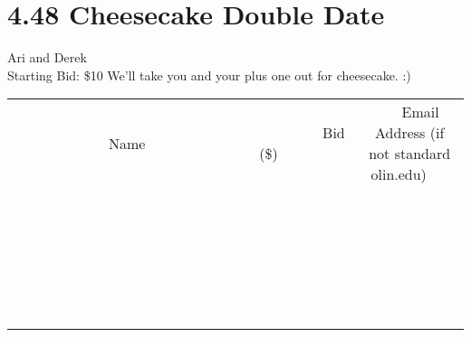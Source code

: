\documentclass[11pt]{article}
\begin{document}
\section*{4.48 Cheesecake Double Date}
Ari and Derek
\\
Starting Bid: \$10
\newline
We'll take you and your plus one out for cheesecake. :)
\\[6ex]
\begin{tabular}{c c c}
~~~~~~~~~~~~~Name~~~~~~~~~~~~~ & ~~~~~~~~~Bid (\$)~~~~~~~~~  & ~~~Email Address (if not standard olin.edu)~~~\\
 & & \\
\hline
 & & \\
\hline
 & & \\
\hline
 & & \\
\hline
 & & \\
\hline
 & & \\
\hline
 & & \\
\hline
 & & \\
\hline
 & & \\
\hline
 & & \\
\hline
 & & \\
\hline
 & & \\
\hline
 & & \\
\hline
 & & \\
\hline
 & & \\
\hline
 & & \\
\hline
 & & \\
\hline
 & & \\
\hline
 & & \\
\hline
 & & \\
\hline
 & & \\
\hline
 & & \\
\hline
 & & \\
\hline
 & & \\
\hline
 & & \\
\hline
 & & \\
\hline
\end{tabular}
\newpage
\end{document}
